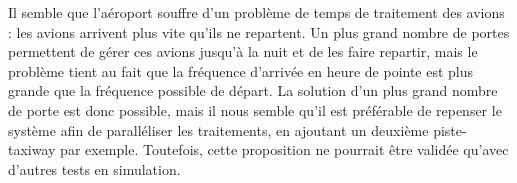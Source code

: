 Il semble que l'aéroport souffre d'un problème de temps de traitement des avions : les avions arrivent plus vite qu'ils ne repartent. Un plus grand nombre de portes permettent de gérer ces avions jusqu'à la nuit et de les faire repartir, mais le problème tient au fait que la fréquence d'arrivée en heure de pointe est plus grande que la fréquence possible de départ.
La solution d'un plus grand nombre de porte est donc possible, mais il nous semble qu'il est préférable de repenser le système afin de paralléliser les traitements, en ajoutant un deuxième piste-taxiway par exemple. Toutefois, cette proposition ne pourrait être validée qu'avec d'autres tests en simulation.


